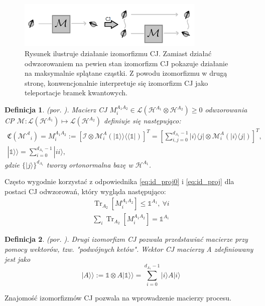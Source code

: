 \documentclass[10pt]{article} %
\newtheorem{definicja}{Definicja}
\DeclareMathOperator{\Trs}{Tr}
\newcommand{\Mats}[1]{\mathcal{L}(#1)}
\newcommand{\Hx}[1]{\mathcal{H}^{#1}}
\newcommand{\HAi}{\Hx{A_1}}
\newcommand{\MXi}[3]{\mathcal{M}^{#1}_{#2}(#3)}
\newcommand{\MAi}[1]{\MXi{A}{i}{#1}}
\newcommand{\Ket}[1]{|#1\rangle}
\newcommand{\Bra}[1]{\langle#1|}
\newcommand{\BBra}[1]{\langle\langle#1|}
\newcommand{\KKet}[1]{|#1\rangle\rangle}
\newcommand{\I}{\mathbb{1}}
\newcommand{\MCJ}{\mathfrak{C}}
\begin{document}
\begin{figure}[t]
\centering
\includegraphics[width=0.8\textwidth]{obrazki/cj_new}
\caption{Rysunek ilustruje działanie izomorfizmu CJ. Zamiast działać odwzorowaniem na pewien stan izomorfizm CJ pokazuje działanie na maksymalnie splątane cząstki. Z powodu izomorfizmu w drugą stronę, konwencjonalnie interpretuje się izomorfizm CJ jako teleportacje bramek kwantowych.}
\end{figure}
\begin{definicja}
(por. \cite{cj_iso1, cj_iso2}).
Macierz CJ $M^{A_1A_2}_i \in \Mats{\Hx{A_1} \otimes \Hx{A_2}} \geq 0$ odwzorowania CP $\mathcal{M}: \mathcal{L}(\Hx{A_1}) \mapsto \mathcal{L}(\Hx{A_2})$ definiuje się następująco:
\begin{gather}
\label{eq:cj_iso}
\MCJ(\mathcal{M^A}_i)= M^{A_1A_2}_i := [\mathcal{I} \otimes \MAi{ \KKet{\I} \BBra{\I}}]^T= \left[\sum^{d_{A_1}-1}_{i,j=0} \Ket{i}\Bra{j} \otimes \mathcal{M}^A_i(\Ket{i}\Bra{j})\right]^T, \\
\KKet{\I} = \sum^{d_{A_1}-1}_{i=0} \Ket{ii},
\end{gather}
gdzie $\{\Ket{j}\}^{d_{A_1}}$ tworzy ortonormalna bazę w $\HAi$. 
\end{definicja}
Często wygodnie korzystać z odpowiednika \eqref{eq:id_proj0} i \eqref{eq:id_proj} dla postaci CJ odwzorowań, który wygląda następująco:
\begin{gather}
\Trs_{A_2} \left[ M^{A_1A_2}_i \right] \leq \I^{A_1},~\forall i\\ 
\sum_i \Trs_{A_2} \left[ M^{A_1A_2}_i \right] = \I^{A_1}
\end{gather}
\begin{definicja}
(por. \cite{cj_iso1, cj_iso2}).
Drugi izomorfizm CJ pozwala przedstawiać macierze przy pomocy wektorów, tzw. "podwójnych ketów". Wektor CJ macierzy A zdefiniowany jest jako
\begin{equation}
\KKet{A} := \I \otimes A\KKet{\I} = \sum^{d_{A_1}-1}_{i=0} \Ket{i} A \Ket{i}
\end{equation}
\end{definicja}
Znajomość izomorfizmów CJ pozwala na wprowadzenie macierzy procesu.
\end{document}
